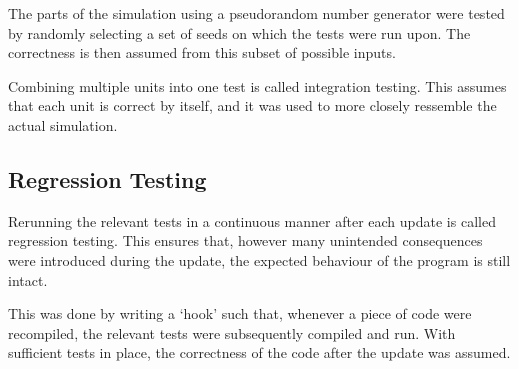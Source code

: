 The parts of the simulation using a pseudorandom number generator were tested by randomly selecting a set of seeds on which the tests were run upon. The correctness is then assumed from this subset of possible inputs.

Combining multiple units into one test is called integration testing. This assumes that each unit is correct by itself, and it was used to more closely ressemble the actual simulation.

\subsection{Regression Testing}
\label{sec:RegressionTesting}

Rerunning the relevant tests in a continuous manner after each update is called regression testing. This ensures that, however many unintended consequences were introduced during the update, the expected behaviour of the program is still intact.

This was done by writing a `hook' such that, whenever a piece of code were recompiled, the relevant tests were subsequently compiled and run. With sufficient tests in place, the correctness of the code after the update was assumed.


